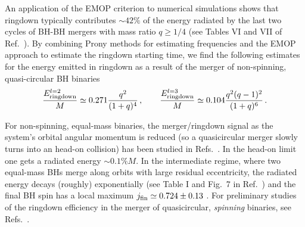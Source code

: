 \documentclass[]{iopart}
\def\be{\begin{equation}}
\def\ee{\end{equation}}
\def\f{\frac}
\def\f{\frac}
\begin{document}
An application of the EMOP criterion to numerical simulations shows that
ringdown typically contributes $\sim 42\%$ of the energy radiated by the last
two cycles of BH-BH mergers with mass ratio $q\geq 1/4$ (see Tables VI and VII
of Ref.~\cite{Berti:2007fi}). By combining Prony methods for estimating
frequencies and the EMOP approach to estimate the ringdown starting time, we
find the following estimates for the energy emitted in ringdown as a result of
the merger of non-spinning, quasi-circular BH binaries \cite{Berti:2007fi}
%
\be
\f{E_{\rm ringdown}^{l=2}}{M}\simeq 0.271 \f{q^2}{(1+q)^4}\,,\qquad
\f{E_{\rm ringdown}^{l=3}}{M}\simeq 0.104 \f{q^2(q-1)^2}{(1+q)^6}\,.
\ee

For non-spinning, equal-mass binaries, the merger/ringdown signal as the
system's orbital angular momentum is reduced (so a quasicircular merger slowly
turns into an head-on collision) has been studied in
Refs.~\cite{Sperhake:2007gu,Hinder:2007qu}.  In the head-on limit one gets a
radiated energy $\sim 0.1\%M$. In the intermediate regime, where two
equal-mass BHs merge along orbits with large residual eccentricity, the
radiated energy decays (roughly) exponentially (see Table I and Fig.~7 in
Ref.~\cite{Sperhake:2007gu}) and the final BH spin has a local maximum $j_{\rm
  fin}\simeq 0.724\pm 0.13$ \cite{Sperhake:2007gu,Hinder:2007qu}. For
preliminary studies of the ringdown efficiency in the merger of quasicircular,
{\em spinning} binaries, see
Refs.~\cite{Berti:2007nw,Vaishnav:2007nm,Shoemaker:2008pe}.
\end{document}

